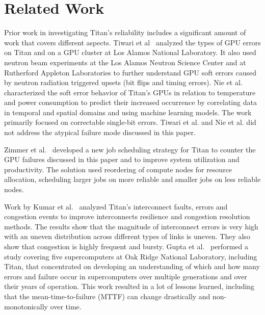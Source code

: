 \section{Related Work}
\label{section:related}

Prior work in investigating Titan's reliability includes a significant amount of work that covers different aspects.
%
Tiwari et al~\cite{7056044} analyzed the types of GPU errors on Titan and on a GPU cluster at Los Alamos National Laboratory. It also used neutron beam experiments at the Los Alamos Neutron Science Center and at Rutherford Appleton Laboratories to further understand GPU soft errors caused by neutron radiation triggered upsets (bit flips and timing errors).
%
Nie et al.~\cite{nie17characterizing,nie18machine} characterized the soft error behavior of Titan's GPUs in relation to temperature and power consumption to predict their increased occurrence by correlating data in temporal and spatial domains and using machine learning models. The work primarily focused on correctable single-bit errors.
%
Tiwari et al. and Nie et al. did not address the atypical failure mode discussed in this paper.

Zimmer et al.~\cite{8665764} developed a new job scheduling strategy for Titan to counter the GPU failures discussed in this paper and to improve system utilization and productivity. The solution used reordering of compute nodes for resource allocation, scheduling larger jobs on more reliable and smaller jobs on less reliable nodes.


Work by Kumar et al.~\cite{kumar18understanding} analyzed Titan's interconnect faults, errors and congestion events to improve interconnects resilience and congestion resolution methods. The results show that the magnitude of interconnect errors is very high with an uneven distribution across different types of links is uneven. They also show that congestion is highly frequent and bursty.
%
Gupta et al.~\cite{gupta17failures} performed a study covering five supercomputers at Oak Ridge National Laboratory, including Titan, that concentrated on developing an understanding of which and how many errors and failure occur in supercomputers over multiple generations and over their years of operation. This work resulted in a lot of lessons learned, including that the mean-time-to-failure (MTTF) can change drastically and non-monotonically over time.

